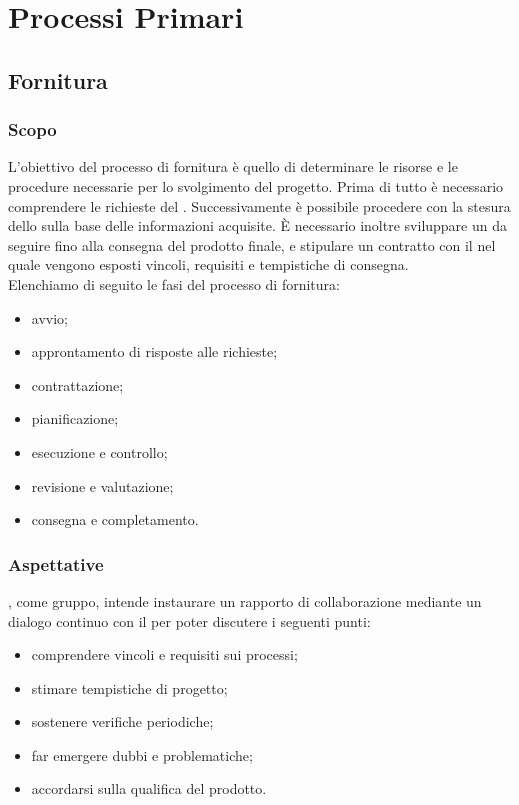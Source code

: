 \section{Processi Primari}
\subsection{Fornitura}
\subsubsection{Scopo}
L'obiettivo del processo di fornitura è quello di determinare le risorse e le procedure necessarie per lo svolgimento del progetto. 
Prima di tutto è necessario comprendere le richieste del \proponProg{}. Successivamente è possibile procedere con la stesura dello \SdFv{} sulla base delle informazioni acquisite.
È necessario inoltre sviluppare un \PdPv{} da seguire fino alla consegna del prodotto finale, e stipulare un contratto con il \proponProg{} nel quale vengono esposti vincoli, requisiti e tempistiche di consegna.\\
Elenchiamo di seguito le fasi del processo di fornitura:
\begin{itemize}
    \item{avvio;}
    \item{approntamento di risposte alle richieste;}
    \item{contrattazione;}
    \item{pianificazione;}
    \item{esecuzione e controllo;}
    \item{revisione e valutazione;}
    \item{consegna e completamento.}
\end{itemize}

\subsubsection{Aspettative}
\Omicron, come gruppo, intende instaurare un rapporto di collaborazione mediante un dialogo continuo con il \proponProg{} per poter discutere i seguenti punti:
\begin{itemize}
    \item{comprendere vincoli e requisiti sui processi;}
    \item{stimare tempistiche di progetto;}
    \item{sostenere verifiche periodiche;}
    \item{far emergere dubbi e problematiche;}
    \item{accordarsi sulla qualifica del prodotto.}
\end{itemize}

